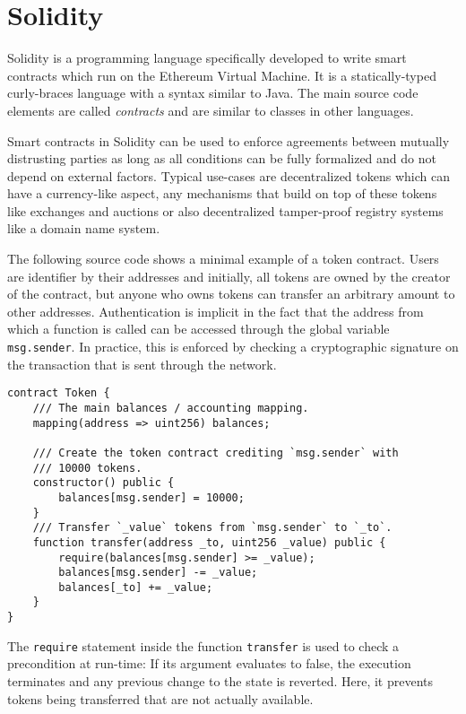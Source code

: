 \section{Solidity}
\label{section:solidity}

Solidity is a programming language specifically developed to write smart contracts
which run on the Ethereum Virtual Machine. It is a statically-typed curly-braces
language with a syntax similar to Java. The main source code elements are
called \emph{contracts} and are similar to classes in other languages.

Smart contracts in Solidity can be used to enforce agreements between
mutually distrusting parties as long as all conditions can be fully formalized
and do not depend on external factors. Typical use-cases are decentralized
tokens which can have a currency-like aspect, any mechanisms that build
on top of these tokens like exchanges and auctions or also decentralized
tamper-proof registry systems like a domain name system.

The following source code shows a minimal example of a token contract.
Users are identifier by their addresses and initially, all tokens are
owned by the creator of the contract, but
anyone who owns tokens can transfer an arbitrary amount to other addresses.
Authentication is implicit in the fact that the address from which
a function is called can be accessed through the global variable
\texttt{msg.sender}. In practice, this is enforced by checking a
cryptographic signature on the transaction that is sent through the network.

\begin{verbatim}
contract Token {
    /// The main balances / accounting mapping.
    mapping(address => uint256) balances;

    /// Create the token contract crediting `msg.sender` with
    /// 10000 tokens.
    constructor() public {
        balances[msg.sender] = 10000;
    }
    /// Transfer `_value` tokens from `msg.sender` to `_to`.
    function transfer(address _to, uint256 _value) public {
        require(balances[msg.sender] >= _value);
        balances[msg.sender] -= _value;
        balances[_to] += _value;
    }
}
\end{verbatim}

The \texttt{require} statement inside the function \texttt{transfer} is used
to check a precondition at run-time: If its argument evaluates to false,
the execution terminates and any previous change to the state is reverted.
Here, it prevents tokens being transferred that are not actually available.

